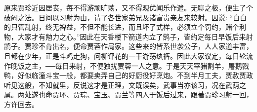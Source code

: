 \begin{parag}
    原来贾珍近因居丧，每不得游顽旷荡，又不得观优闻乐作遣。无聊之极，便生了个破闷之法。日间以习射为由，请了各世家弟兄及诸富贵亲友来较射。因说: “白白的只管乱射，终无裨益，不但不能长进，而且坏了式样，必须立个罚约，赌个利物，大家才有勉力之心。”因此在天香楼下箭道内立了鹄子，皆约定每日早饭后来射鹄子。贾珍不肯出名，便命贾蓉作局家。这些来的皆系世袭公子，人人家道丰富，且都在少年，正是斗鸡走狗，问柳评花的一干游荡纨裤。因此大家议定，每日轮流作晚饭之主，──每日来射，不便独扰贾蓉一人之意。于是天天宰猪割羊，屠鹅戮鸭，好似临潼斗宝一般，都要卖弄自己的好厨役好烹炮。不到半月工夫，贾赦贾政听见这般，不知就里，反说这才是正理，文既误矣，武事当亦该习，况在武荫之属。两处遂也命贾环、贾琮、宝玉、贾兰等四人于饭后过来，跟著贾珍习射一回，方许回去。
\end{parag}


